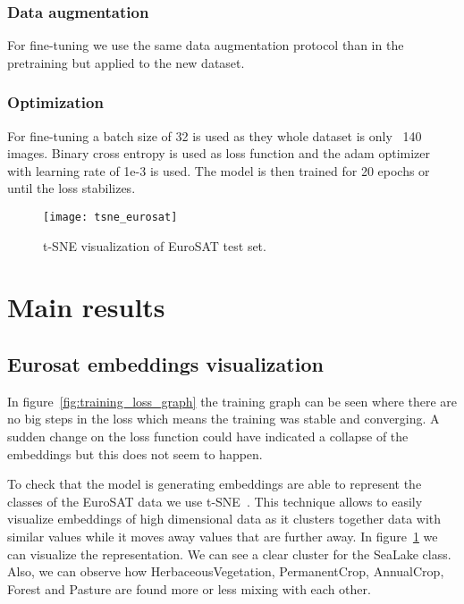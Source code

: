\documentclass[conference]{IEEEtran}
\begin{document}
    \subsubsection{Data augmentation}
    For fine-tuning we use the same data augmentation protocol than in the pretraining but applied to the new dataset.

    \subsubsection{Optimization}
    For fine-tuning a batch size of 32 is used as they whole dataset is only ~140 images.
    Binary cross entropy is used as loss function and the adam optimizer with learning rate of 1e-3 is used.
    The model is then trained for 20 epochs or until the loss stabilizes.


    \begin{figure}[h]
        \centering
        \texttt{[image: tsne\_eurosat]}
        \caption{t-SNE visualization of EuroSAT test set.}
        \label{fig:tsne_eurosat}
    \end{figure}

    \section{Main results}

    \subsection{Eurosat embeddings visualization}

    In figure~\ref{fig:training_loss_graph} the training graph can be seen where there are no big steps in the loss which means the training was stable and converging.
    A sudden change on the loss function could have indicated a collapse of the embeddings but this does not seem to happen.

    To check that the model is generating embeddings are able to represent the classes of the EuroSAT data we use t-SNE~\cite{JMLR:v9:vandermaaten08a}.
    This technique allows to easily visualize embeddings of high dimensional data as it clusters together data with similar values while it moves away
    values that are further away.
    In figure~\ref{fig:tsne_eurosat} we can visualize the representation.
    We can see a clear cluster for the SeaLake class.
    Also, we can observe how HerbaceousVegetation, PermanentCrop, AnnualCrop, Forest and Pasture are found more or less mixing with each other.
\end{document}
